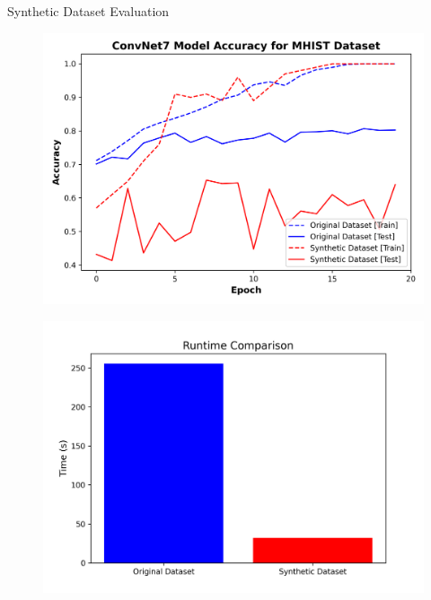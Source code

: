 \documentclass[final]{beamer}
\newlength{\colwidth}
\begin{document}
\begin{columns}
\begin{column}{\colwidth}
\begin{block}{Synthetic Dataset Evaluation}
\begin{figure}[ht]
\begin{minipage}{0.48\textwidth}
				\end{minipage}
				\hfill
				\begin{minipage}{0.48\textwidth}
					\centering
					\includegraphics[width=\textwidth]{../report/figures/mhist_syn_acc.png}

				\end{minipage}

			\end{figure}
			
			\begin{figure}[ht]
				\centering
				\begin{minipage}{0.48\textwidth}
					\centering
					\includegraphics[width=\textwidth]{../report/figures/mnist_syn_time.png}
					

\end{minipage}
\end{figure}
\end{block}
\end{column}
\end{columns}
\end{document}
